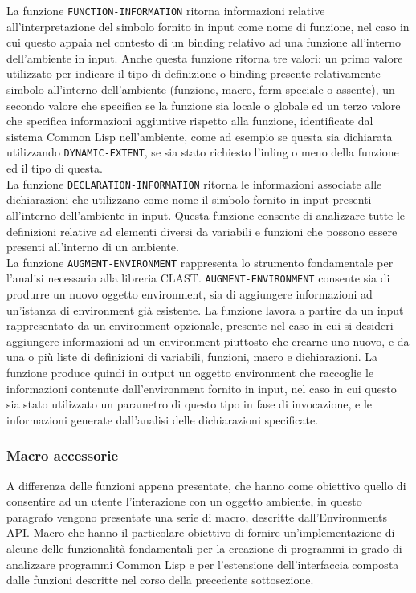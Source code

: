 La funzione \texttt{FUNCTION-INFORMATION} ritorna informazioni relative
all’interpretazione del simbolo fornito in input come nome di funzione, nel caso
in cui questo appaia nel contesto di un binding relativo ad una funzione
all’interno dell’ambiente in input. Anche questa funzione ritorna tre valori: un
primo valore utilizzato per indicare il tipo di definizione o binding presente
relativamente simbolo all’interno dell’ambiente (funzione, macro, form speciale
o assente), un secondo valore che specifica se la funzione sia locale o globale
ed un terzo valore che specifica informazioni aggiuntive rispetto alla funzione,
identificate dal sistema Common Lisp nell’ambiente, come ad esempio se questa
sia dichiarata utilizzando \texttt{DYNAMIC-EXTENT}, se sia stato richiesto
l’inling o meno della funzione ed il tipo di questa.\\

La funzione \texttt{DECLARATION-INFORMATION} ritorna le informazioni associate
alle dichiarazioni che utilizzano come nome il simbolo fornito in input presenti
all’interno dell'ambiente in input. Questa funzione consente di analizzare tutte
le definizioni relative ad elementi diversi da variabili e funzioni che possono
essere presenti all’interno di un ambiente.\\

La funzione \texttt{AUGMENT-ENVIRONMENT} rappresenta lo strumento fondamentale
per l’analisi necessaria alla libreria CLAST. \texttt{AUGMENT-ENVIRONMENT}
consente sia di produrre un nuovo oggetto environment, sia di aggiungere
informazioni ad un'istanza di environment già esistente. La funzione lavora a
partire da un input rappresentato da un environment opzionale, presente nel
caso in cui si desideri aggiungere informazioni ad un environment piuttosto
che crearne uno nuovo, e da una o più liste di definizioni di variabili,
funzioni, macro e dichiarazioni. La funzione produce quindi in output un
oggetto environment che raccoglie le informazioni contenute dall'environment
fornito in input, nel caso in cui questo sia stato utilizzato un parametro di
questo tipo in fase di invocazione, e le informazioni generate dall'analisi
delle dichiarazioni specificate.\\

\subsubsection{Macro accessorie}

A differenza delle funzioni appena presentate, che hanno come obiettivo quello
di consentire ad un utente l'interazione con un oggetto ambiente, in questo
paragrafo vengono presentate una serie di macro, descritte dall'Environments
API. Macro che hanno il particolare obiettivo di fornire un'implementazione di
alcune delle funzionalità fondamentali per la creazione di programmi in grado di
analizzare programmi Common Lisp e per l'estensione dell'interfaccia composta
dalle funzioni descritte nel corso della precedente sottosezione.\\

